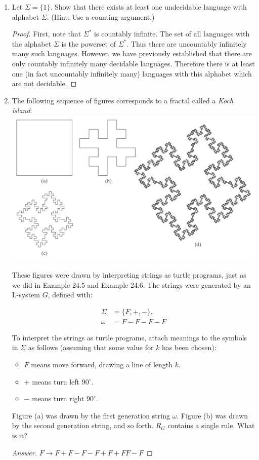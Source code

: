 \documentclass[10pt]{article}
\begin{document}
\begin{enumerate}[1)]
\item
Let $\Sigma = \{1\}$.  Show that there exists at least one undecidable language with alphabet $\Sigma$.   (Hint: Use a counting argument.)
\begin{proof}[Proof]
First, note that $\Sigma ^*$ is countably infinite.  The set of all languages with the alphabet $\Sigma$ is the powerset of $\Sigma ^*$.  Thus there are uncountably infinitely many such languages.  However, we have previously established that there are only countably infinitely many decidable languages.  Therefore there is at least one (in fact uncountably infinitely many) languages with this alphabet which are not decidable.
\end{proof}


\item
The following sequence of figures corresponds to a fractal called a \textit{Koch island}:\\

\includegraphics[scale=.4]{images/p8.png}

These figures were drawn by interpreting strings as turtle programs, just as we did in Example 24.5 and Example 24.6.  The strings were generated by an L-system $G$, defined with:

\begin{align*}
\Sigma &= \{F, +, -\}.\\
\omega &= F - F - F - F
\end{align*}

To interpret the strings as turtle programs, attach meanings to the symbols in $\Sigma$ as follows (assuming that some value for $k$ has been chosen):
\begin{itemize}
\item
$F$ means move forward, drawing a line of length $k$.
\item
$+$ means turn left $90^\circ$.
\item
$-$ means turn right $90^\circ$.
\end{itemize}

Figure (a) was drawn by the first generation string $\omega$.  Figure (b) was drawn by the second generation string, and so forth.  $R_G$ contains a single rule.  What is it?
\begin{proof}[Answer]
$F \rightarrow F + F - F - F + F + FF - F$
\end{proof}
\end{enumerate}
\end{document}
